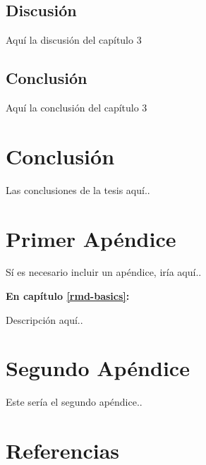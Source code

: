 \documentclass[12pt,oneside]{reedthesis}
\begin{document}
\section{Discusión}\label{discusiuxf3n-2}

Aquí la discusión del capítulo 3

\section{Conclusión}\label{conclusiuxf3n-2}

Aquí la conclusión del capítulo 3\\

\hfill\break

\chapter*{Conclusión}\label{conclusiuxf3n-3}

Las conclusiones de la tesis aquí..

\appendix

\chapter{Primer Apéndice}\label{primer-apuxe9ndice}

Sí es necesario incluir un apéndice, iría aquí..

\textbf{En capítulo \ref{rmd-basics}:}

Descripción aquí..

\chapter{Segundo Apéndice}\label{segundo-apuxe9ndice}

Este sería el segundo apéndice..

\backmatter

\chapter*{Referencias}\label{referencias}

\printbibliography[heading=none]


\noindent

\setlength{\parindent}{-0.20in}


\end{document}
